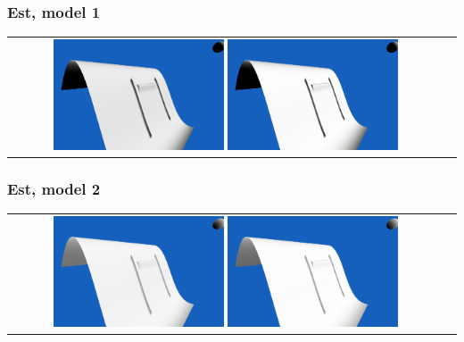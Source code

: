 \documentclass[a4paper]{article}
\begin{document}
\subsubsection{Est, model 1}
\begin{tabular}{cc}
\includegraphics[width=0.4\textwidth]{Images/Essais/Essai_7_phong_East_0.png}
\includegraphics[width=0.4\textwidth]{Images/Essais/Essai_7_slint_East_0.png}
\end{tabular}
\subsubsection{Est, model 2}
\begin{tabular}{cc}
\includegraphics[width=0.4\textwidth]{Images/Essais/Essai_7_phong_East_1.png}
\includegraphics[width=0.4\textwidth]{Images/Essais/Essai_7_slint_East_1.png}
\end{tabular}
\end{document}
